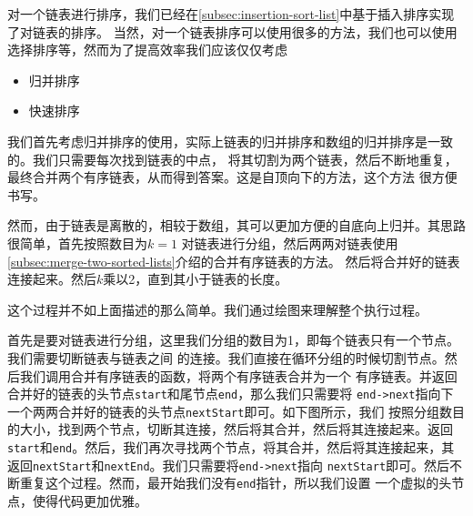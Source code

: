 \documentclass[../../main.tex]{subfiles}
\begin{document}
对一个链表进行排序，我们已经在\ref{subsec:insertion-sort-list}中基于插入排序实现了对链表的排序。
当然，对一个链表排序可以使用很多的方法，我们也可以使用选择排序等，然而为了提高效率我们应该仅仅考虑

\begin{itemize}
  \item 归并排序
  \item 快速排序
\end{itemize}

我们首先考虑归并排序的使用，实际上链表的归并排序和数组的归并排序是一致的。我们只需要每次找到链表的中点，
将其切割为两个链表，然后不断地重复，最终合并两个有序链表，从而得到答案。这是自顶向下的方法，这个方法
很方便书写。

然而，由于链表是离散的，相较于数组，其可以更加方便的自底向上归并。其思路很简单，首先按照数目为$k = 1$
对链表进行分组，然后两两对链表使用\ref{subsec:merge-two-sorted-lists}介绍的合并有序链表的方法。
然后将合并好的链表连接起来。然后$k$乘以2，直到其小于链表的长度。

这个过程并不如上面描述的那么简单。我们通过绘图来理解整个执行过程。


首先是要对链表进行分组，这里我们分组的数目为1，即每个链表只有一个节点。我们需要切断链表与链表之间
的连接。我们直接在循环分组的时候切割节点。然后我们调用合并有序链表的函数，将两个有序链表合并为一个
有序链表。并返回合并好的链表的头节点\texttt{start}和尾节点\texttt{end}，那么我们只需要将
\texttt{end->next}指向下一个两两合并好的链表的头节点\texttt{nextStart}即可。如下图所示，我们
按照分组数目的大小，找到两个节点，切断其连接，然后将其合并，然后将其连接起来。返回
\texttt{start}和\texttt{end}。然后，我们再次寻找两个节点，将其合并，然后将其连接起来，其
返回\texttt{nextStart}和\texttt{nextEnd}。我们只需要将\texttt{end->next}指向
\texttt{nextStart}即可。然后不断重复这个过程。然而，最开始我们没有\texttt{end}指针，所以我们设置
一个虚拟的头节点，使得代码更加优雅。
\end{document}
